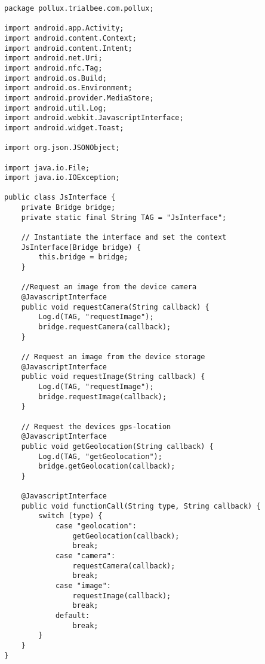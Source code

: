 \begin{lstlisting}
package pollux.trialbee.com.pollux;

import android.app.Activity;
import android.content.Context;
import android.content.Intent;
import android.net.Uri;
import android.nfc.Tag;
import android.os.Build;
import android.os.Environment;
import android.provider.MediaStore;
import android.util.Log;
import android.webkit.JavascriptInterface;
import android.widget.Toast;

import org.json.JSONObject;

import java.io.File;
import java.io.IOException;

public class JsInterface {  
    private Bridge bridge;
    private static final String TAG = "JsInterface";

    // Instantiate the interface and set the context
    JsInterface(Bridge bridge) {
        this.bridge = bridge;
    }

    //Request an image from the device camera
    @JavascriptInterface
    public void requestCamera(String callback) {
        Log.d(TAG, "requestImage");
        bridge.requestCamera(callback);
    }

    // Request an image from the device storage
    @JavascriptInterface
    public void requestImage(String callback) {
        Log.d(TAG, "requestImage");
        bridge.requestImage(callback);
    }

    // Request the devices gps-location
    @JavascriptInterface
    public void getGeolocation(String callback) {
        Log.d(TAG, "getGeolocation");
        bridge.getGeolocation(callback);
    }

    @JavascriptInterface
    public void functionCall(String type, String callback) {
        switch (type) {
            case "geolocation":
                getGeolocation(callback);
                break;
            case "camera":
                requestCamera(callback);
                break;
            case "image":
                requestImage(callback);
                break;
            default:
                break;
        }
    }
}
\end{lstlisting}

